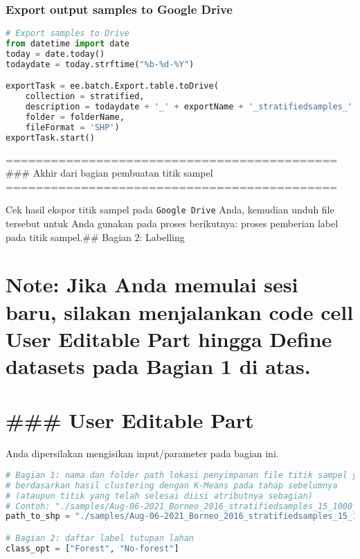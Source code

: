 \hypertarget{export-output-samples-to-google-drive}{%
\subsubsection{Export output samples to Google
Drive}\label{export-output-samples-to-google-drive}}

\begin{lstlisting}[language=Python]
# Export samples to Drive
from datetime import date
today = date.today()
todaydate = today.strftime("%b-%d-%Y")

exportTask = ee.batch.Export.table.toDrive(
    collection = stratified,
    description = todaydate + '_' + exportName + '_stratifiedsamples_' + str(num_cluster) + '_' + str(num_out_samples),
    folder = folderName,
    fileFormat = 'SHP')
exportTask.start()
\end{lstlisting}

============================================ \#\#\# Akhir dari bagian
pembuatan titik sampel ============================================

Cek hasil ekspor titik sampel pada
\passthrough{\lstinline!Google Drive!} Anda, kemudian unduh file
tersebut untuk Anda gunakan pada proses berikutnya: proses pemberian
label pada titik sampel.\#\# Bagian 2: Labelling

\hypertarget{note-jika-anda-memulai-sesi-baru-silakan-menjalankan-code-cell-user-editable-part-hingga-define-datasets-pada-bagian-1-di-atas.}{%
\section{\texorpdfstring{Note: Jika Anda memulai sesi baru, silakan
menjalankan code cell \textbf{User Editable Part} hingga \textbf{Define
datasets} pada Bagian 1 di
atas.}{Note: Jika Anda memulai sesi baru, silakan menjalankan code cell User Editable Part hingga Define datasets pada Bagian 1 di atas.}}\label{note-jika-anda-memulai-sesi-baru-silakan-menjalankan-code-cell-user-editable-part-hingga-define-datasets-pada-bagian-1-di-atas.}}

\hypertarget{user-editable-part}{%
\section{\#\#\# User Editable Part}\label{user-editable-part}}

Anda dipersilakan mengisikan input/parameter pada bagian ini.

\begin{lstlisting}[language=Python]
# Bagian 1: nama dan folder path lokasi penyimpanan file titik sampel yang dibuat 
# berdasarkan hasil clustering dengan K-Means pada tahap sebelumnya 
# (ataupun titik yang telah selesai diisi atributnya sebagian)
# Contoh: "./samples/Aug-06-2021_Borneo_2016_stratifiedsamples_15_1000_gcs.shp"
path_to_shp = "./samples/Aug-06-2021_Borneo_2016_stratifiedsamples_15_1000_gcs.shp"

# Bagian 2: daftar label tutupan lahan
class_opt = ["Forest", "No-forest"]
\end{lstlisting}


